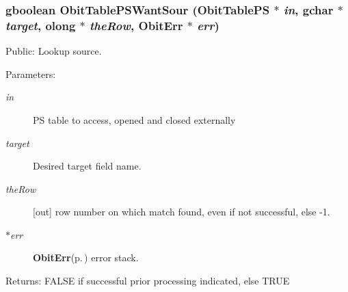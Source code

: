 \subsubsection{\setlength{\rightskip}{0pt plus 5cm}gboolean Obit\-Table\-PSWant\-Sour ({\bf Obit\-Table\-PS} $\ast$ {\em in}, gchar $\ast$ {\em target}, {\bf olong} $\ast$ {\em the\-Row}, {\bf Obit\-Err} $\ast$ {\em err})}\label{ObitTablePSUtil_8c_a0}


Public: Lookup source. 

\begin{Desc}
\item[Parameters:]
\begin{description}
\item[{\em in}]PS table to access, opened and closed externally \item[{\em target}]Desired target field name. \item[{\em the\-Row}][out] row number on which match found, even if not successful, else -1. \item[{\em $\ast$err}]{\bf Obit\-Err}{\rm (p.\,\pageref{structObitErr})} error stack. \end{description}
\end{Desc}
\begin{Desc}
\item[Returns:]FALSE if successful prior processing indicated, else TRUE \end{Desc}

